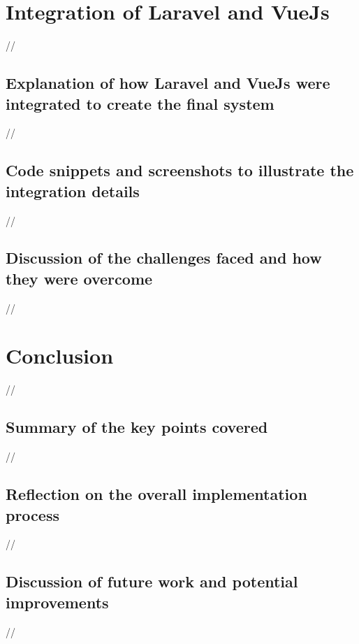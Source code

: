 \section {Integration of Laravel and VueJs}
//
\subsection {Explanation of how Laravel and VueJs were integrated to create the final system}
//
\subsection {Code snippets and screenshots to illustrate the integration details}
//
\subsection {Discussion of the challenges faced and how they were overcome}

//
    \section {Conclusion}
//
    \subsection {Summary of the key points covered}
//
    \subsection {Reflection on the overall implementation process}
//
    \subsection {Discussion of future work and potential improvements}

    //